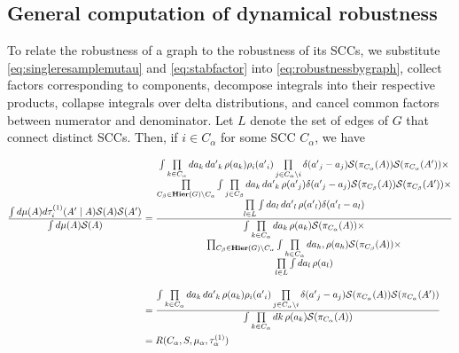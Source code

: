 \subsection{General computation of dynamical robustness}

To relate the robustness of a graph to the robustness of its SCCs, we substitute \ref{eq:singleresamplemutau} and \ref{eq:stabfactor} into \ref{eq:robustnessbygraph}, collect factors corresponding to components, decompose integrals into their respective products, collapse integrals over delta distributions, and cancel common factors between numerator and denominator.  Let $L$ denote the set of edges of $G$ that connect distinct SCCs.  Then, if $i \in C_\alpha$ for some SCC $C_\alpha$, we have
\begin{widetext}
\begin{equation}\label{eq:robustncessforsccs}
\begin{aligned}
\frac{\int d\mu(A) d\tau^{(1)}_i (A' \mid A) \mathcal{S}(A) \mathcal{S}(A')}
       {\int d\mu(A) \mathcal{S}(A)}
&= \frac{\begin{matrix}
  \int \prod\limits_{k \in C_\alpha} da_k\,d{a'}_k\, \rho(a_k)
    \rho_i({a'}_i) \prod\limits_{j \in C_\alpha \setminus i} \delta ({a'}_j - a_j)
    \mathcal{S}(\pi_{C_{\alpha}}(A)) \mathcal{S}(\pi_{C_{\alpha}}(A')) \times \\
 \prod\limits_{C_\beta \in \mathbf{Hier}(G) \setminus C_\alpha} \int
   \prod\limits_{j \in C_\beta} da_k\,d{a'}_k\, \rho({a'}_j) \delta ({a'}_j - a_j)
      \mathcal{S}(\pi_{C_{\beta}}(A)) \mathcal{S}(\pi_{C_{\beta}}(A')) \times \\
 \prod\limits_{l \in L} \int da_l\,d{a'}_l\,\rho({a'}_l) \delta({a'}_l - a_l) \end{matrix}}
{\begin{matrix}\int \prod\limits_{k \in C_\alpha} da_k\,\rho(a_k) \mathcal{S}(\pi_{C_{\alpha}}(A)) \times \\
 \prod_{C_\beta \in \mathbf{Hier}(G) \setminus C_\alpha}
   \int \prod\limits_{h \in C_\alpha} da_h,\rho(a_h) \mathcal{S}(\pi_{C_{\beta}}(A)) \times \\
 \prod\limits_{l \in L} \int da_l\,\rho(a_l) \end{matrix}} \\[1em]
&= \frac{\int \prod\limits_{k \in C_\alpha} da_k\,d{a'}_k\,\rho(a_k)
    \rho_i({a'}_i) \prod\limits_{j \in C_\alpha \setminus i} \delta ({a'}_j - a_j)
    \mathcal{S}(\pi_{C_{\alpha}}(A)) \mathcal{S}(\pi_{C_{\alpha}}(A'))}
{\int \prod\limits_{k \in C_\alpha} dk\, \rho(a_k) \mathcal{S}(\pi_{C_{\alpha}}(A))} \\
&= R(C_{\alpha}, S, \mu_\alpha, \tau^{(1)}_\alpha)
\end{aligned}
\end{equation}
\end{widetext}
